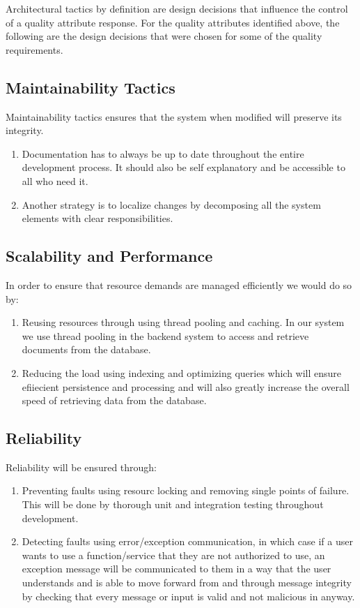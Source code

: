 Architectural tactics by definition are design decisions that influence the control of a quality attribute response. For the quality attributes identified above, the following are the design decisions that were chosen for some of the quality requirements.

\subsection{Maintainability Tactics}
	Maintainability tactics ensures that the system when modified will preserve its integrity. 
	\begin{enumerate}
		\item Documentation has to always be up to date throughout the entire development process. It should also be self explanatory and be accessible to all who need it.
		\item Another strategy is to localize changes by decomposing all the system elements with clear responsibilities.
	\end{enumerate}
	
\subsection{Scalability and Performance}
	In order to ensure that resource demands are managed efficiently we would do so by: 
		\begin{enumerate}
			\item Reusing resources through using thread pooling and caching. In our system we use thread pooling in the backend system to access and retrieve documents from the database.   
			\item Reducing the load using indexing and optimizing queries which will ensure efiiecient persistence and processing and will also greatly increase the overall speed of retrieving data from the database.
		\end{enumerate}
		
\subsection{Reliability}
	Reliability will be ensured through:
	\begin{enumerate}
		\item Preventing faults using resourc locking and removing single points of failure. This will be done by thorough unit and integration testing throughout development. 
		\item Detecting faults using error/exception communication, in which case if a user wants to use a function/service that they are not authorized to use, an exception message will be communicated to them in a way that the user understands and is able to move forward from and through message integrity by checking that every message or input is valid and not malicious in anyway.
	\end{enumerate}
	
